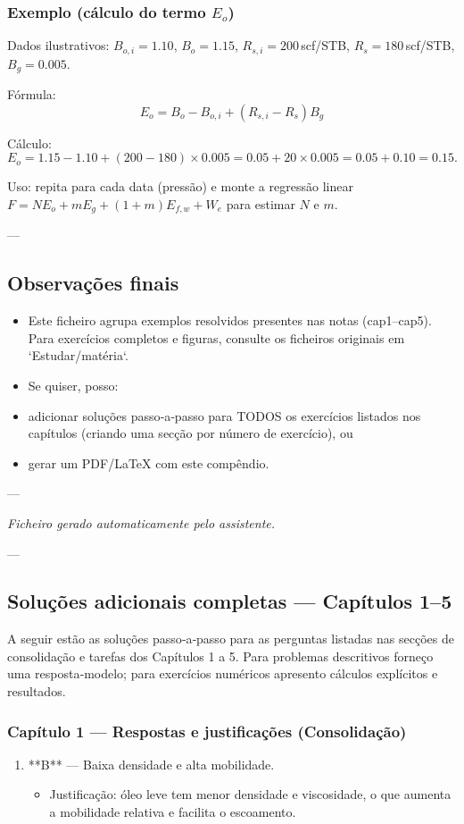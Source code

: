 \documentclass[11pt,a4paper]{article}
\begin{document}
\subsubsection{Exemplo (cálculo do termo $E_o$)}
Dados ilustrativos: $B_{o,i}=1.10$, $B_o=1.15$, $R_{s,i}=200\,$scf/STB, $R_s=180\,$scf/STB, $B_g=0.005$.

Fórmula:
$$E_o = B_o - B_{o,i} + (R_{s,i}-R_s)B_g$$

Cálculo:
$$E_o = 1.15 - 1.10 + (200-180)\times0.005 = 0.05 + 20\times0.005 = 0.05 + 0.10 = 0.15.$$ 

Uso: repita para cada data (pressão) e monte a regressão linear $F= N E_o + m E_g + (1+m)E_{f,w} + W_e$ para estimar $N$ e $m$.

---

\subsection{Observações finais}
\begin{itemize}
\item Este ficheiro agrupa exemplos resolvidos presentes nas notas (cap1–cap5). Para exercícios completos e figuras, consulte os ficheiros originais em `Estudar/matéria`.
\item Se quiser, posso:
\item adicionar soluções passo‑a‑passo para TODOS os exercícios listados nos capítulos (criando uma secção por número de exercício), ou
\item gerar um PDF/LaTeX com este compêndio.
\end{itemize}

---

\emph{Ficheiro gerado automaticamente pelo assistente.}

---

\subsection{Soluções adicionais completas — Capítulos 1–5}

A seguir estão as soluções passo‑a‑passo para as perguntas listadas nas secções de consolidação e tarefas dos Capítulos 1 a 5. Para problemas descritivos forneço uma resposta‑modelo; para exercícios numéricos apresento cálculos explícitos e resultados.

\subsubsection{Capítulo 1 — Respostas e justificações (Consolidação)}
\begin{enumerate}
\item **B** — Baixa densidade e alta mobilidade.
\begin{itemize}
\item Justificação: óleo leve tem menor densidade e viscosidade, o que aumenta a mobilidade relativa e facilita o escoamento.
\end{itemize}
\end{enumerate}
\end{document}
